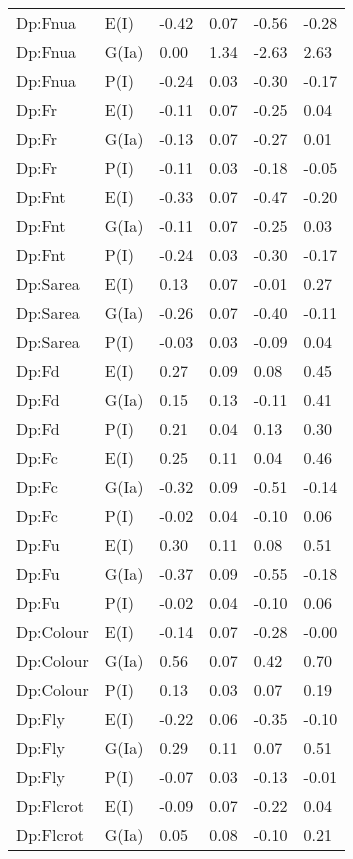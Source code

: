 \begin{center}
\begin{longtable}{|p{1.1in}|p{0.7in}|p{0.7in}|p{0.6in}|p{0.6in}|p{0.6in}|}
  Dp:Fnua & E(I) & -0.42 & 0.07 & -0.56 & -0.28 \\ 
  Dp:Fnua & G(Ia) & 0.00 & 1.34 & -2.63 & 2.63 \\ 
  Dp:Fnua & P(I) & -0.24 & 0.03 & -0.30 & -0.17 \\ 
  Dp:Fr & E(I) & -0.11 & 0.07 & -0.25 & 0.04 \\ 
  Dp:Fr & G(Ia) & -0.13 & 0.07 & -0.27 & 0.01 \\ 
  Dp:Fr & P(I) & -0.11 & 0.03 & -0.18 & -0.05 \\ 
  Dp:Fnt & E(I) & -0.33 & 0.07 & -0.47 & -0.20 \\ 
  Dp:Fnt & G(Ia) & -0.11 & 0.07 & -0.25 & 0.03 \\ 
  Dp:Fnt & P(I) & -0.24 & 0.03 & -0.30 & -0.17 \\ 
  Dp:Sarea & E(I) & 0.13 & 0.07 & -0.01 & 0.27 \\ 
  Dp:Sarea & G(Ia) & -0.26 & 0.07 & -0.40 & -0.11 \\ 
  Dp:Sarea & P(I) & -0.03 & 0.03 & -0.09 & 0.04 \\ 
  Dp:Fd & E(I) & 0.27 & 0.09 & 0.08 & 0.45 \\ 
  Dp:Fd & G(Ia) & 0.15 & 0.13 & -0.11 & 0.41 \\ 
  Dp:Fd & P(I) & 0.21 & 0.04 & 0.13 & 0.30 \\ 
  Dp:Fc & E(I) & 0.25 & 0.11 & 0.04 & 0.46 \\ 
  Dp:Fc & G(Ia) & -0.32 & 0.09 & -0.51 & -0.14 \\ 
  Dp:Fc & P(I) & -0.02 & 0.04 & -0.10 & 0.06 \\ 
  Dp:Fu & E(I) & 0.30 & 0.11 & 0.08 & 0.51 \\ 
  Dp:Fu & G(Ia) & -0.37 & 0.09 & -0.55 & -0.18 \\ 
  Dp:Fu & P(I) & -0.02 & 0.04 & -0.10 & 0.06 \\ 
  Dp:Colour & E(I) & -0.14 & 0.07 & -0.28 & -0.00 \\ 
  Dp:Colour & G(Ia) & 0.56 & 0.07 & 0.42 & 0.70 \\ 
  Dp:Colour & P(I) & 0.13 & 0.03 & 0.07 & 0.19 \\ 
  Dp:Fly & E(I) & -0.22 & 0.06 & -0.35 & -0.10 \\ 
  Dp:Fly & G(Ia) & 0.29 & 0.11 & 0.07 & 0.51 \\ 
  Dp:Fly & P(I) & -0.07 & 0.03 & -0.13 & -0.01 \\ 
  Dp:Flcrot & E(I) & -0.09 & 0.07 & -0.22 & 0.04 \\ 
  Dp:Flcrot & G(Ia) & 0.05 & 0.08 & -0.10 & 0.21 \\ 

\end{longtable}
\end{center}
